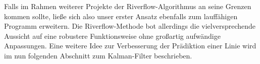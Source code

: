 Falls im Rahmen weiterer Projekte der Riverflow-Algorithmus an seine Grenzen kommen sollte, ließe sich also unser erster Ansatz ebenfalls zum lauffähigen Programm erweitern. Die Riverflow-Methode bot allerdings die vielversprechende Aussicht auf eine robustere Funktionsweise ohne großartig aufwändige Anpassungen. Eine weitere Idee zur Verbesserung der Prädiktion einer Linie wird im nun folgenden Abschnitt zum Kalman-Filter beschrieben.

